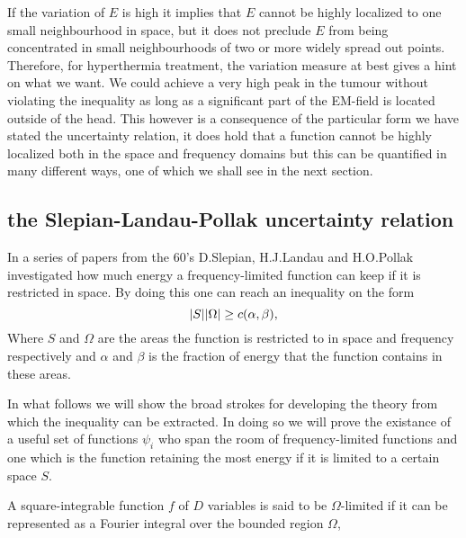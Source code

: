 \documentclass[11pt,a4paper, 
english, swedish %
]{article}
\begin{document}
If the variation of $E$ is high it implies that $E$ cannot be highly localized to one small neighbourhood in space, but it does not preclude $E$ from being concentrated in small neighbourhoods of two or more widely spread out points. Therefore, for hyperthermia treatment, the variation measure at best gives a hint on what we want. We could achieve a very high peak in the tumour without violating the inequality as long as a significant part of the EM-field is located outside of the head.
This however is a consequence of the particular form we have stated the uncertainty relation, it does hold that a function cannot be highly localized both in the space and frequency domains but this can be quantified in many different ways, one of which we shall see in the next section.

\subsection{the Slepian-Landau-Pollak uncertainty relation}
In a series of papers from the 60's D.Slepian, H.J.Landau and H.O.Pollak investigated how much energy a frequency-limited function can keep if it is restricted in space. By doing this one can reach an inequality on the form
\begin{equation}
\abs{S}\abs{\Omega} \geq c(\alpha,\beta),
\end{equation}
Where $S$ and $\Omega$ are the areas the function is restricted to in space and frequency respectively and $\alpha$ and $\beta$ is the fraction of energy that the function contains in these areas. 

In what follows we will show the broad strokes for developing the theory from which the inequality can be extracted. In doing so we will prove the existance of a useful set of functions ${\psi_i}$ who span the room of frequency-limited functions and one which is the function retaining the most energy if it is limited to a certain space $S$.

A square-integrable function $f$ of $D$ variables is said to be $\Omega$-limited if it can be represented as a Fourier integral over the bounded region $\Omega$,
\end{document}

